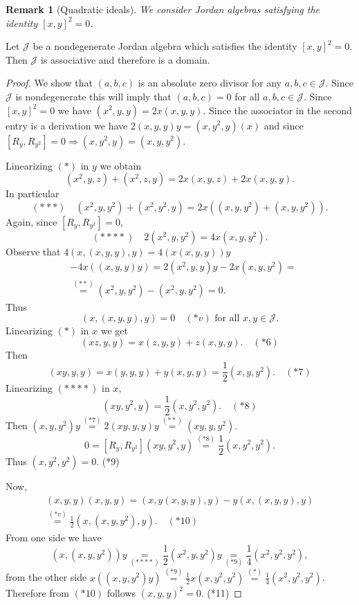 \documentclass{article}
\newtheorem{remark}[theorem]{Remark}
\begin{document}
\begin{remark}[Quadratic ideals]
We consider Jordan algebras satisfying the identity $[x, y]^2 = 0$.
\end{remark}

\begin{theorem}
Let $\mathcal{J}$ be a nondegenerate Jordan algebra which satisfies the identity $[x,y]^2=0$. Then $\mathcal{J}$ is associative and therefore is a domain.
\end{theorem}

\begin{proof}
We show that $(a,b,c)$ is an absolute zero divisor for any $a,b,c \in \mathcal{J}$. Since $\mathcal{J}$ is nondegenerate this will imply that $(a,b,c)=0$ for all $a,b,c \in \mathcal{J}$. Since $[x,y]^2=0$ we have $(x^2,y,y)=2x(x,y,y)$. Since the associator in the second entry is a derivation we have $2(x,y,y)y=(x,y^2,y)(x)$ and since $[R_y,R_{y^2}]=0 \Rightarrow (x,y^2,y)=(x,y,y^2)$.

Linearizing $(*)$ in $y$ we obtain
\[
(x^2,y,z)+(x^2,z,y)=2x(x,y,z)+2x(x,y,y).
\]
In particular
\[
(***)\quad (x^2,y,y^2)+(x^2,y^2,y)=2x\left((x,y,y^2)+(x,y,y^2)\right).
\]
Again, since $[R_y,R_{y^2}]=0$,
\[
(****)\quad 2(x^2,y,y^2)=4x(x,y,y^2).
\]
Observe that $4(x,(x,y,y),y)=4(x(x,y,y))y$
\[
\begin{aligned}
&-4x((x,y,y)y)=2(x^2,y,y)y-2x(x,y,y^2)= \\
&\stackrel{(**)}{=}(x^2,y,y^2)-(x^2,y,y^2)=0.
\end{aligned}
\]
Thus
\[
(x,(x,y,y),y)=0 \quad (*v) \text{ for all } x,y \in \mathcal{J}.
\]
Linearizing $(*)$ in $x$ we get
\[
(xz,y,y)=x(z,y,y)+z(x,y,y). \quad (*6)
\]
Then
\[
(xy,y,y)=x(y,y,y)+y(x,y,y)=\frac{1}{2}(x,y,y^2). \quad (*7)
\]
Linearizing $(****)$ in $x$,
\[
(xy,y^2,y)=\frac{1}{2}(x,y^2,y^2). \quad (*8)
\]
Then $(x,y,y^2)y \stackrel{(*7)}{=} 2(xy,y,y)y \stackrel{(**)}{=} (xy,y,y^2)$.
\[
0=[R_y,R_{y^2}](xy,y^2,y) \stackrel{(*8)}{=} \frac{1}{2}(x,y^2,y^2).
\]
Thus $(x,y^2,y^2)=0$. \quad (*9)

Now,
\[
\begin{gathered}
(x,y,y)(x,y,y)=(x,y(x,y,y),y)-y(x,(x,y,y),y) \\
\stackrel{(*v)}{=} \frac{1}{2}\left(x,\left(x,y,y^2\right),y\right). \quad (*10)
\end{gathered}
\]
From one side we have
\[
\left(x,\left(x,y,y^2\right)\right)y \underset{(****)}{=} \frac{1}{2}(x^2,y,y^2)y \underset{(*9)}{=} \frac{1}{4}(x^2,y^2,y^2),
\]
from the other side $x\left(\left(x,y,y^2\right)y\right) \stackrel{(*9)}{=} \frac{1}{2}x\left(x,y^2,y^2\right) \stackrel{(*)}{=} \frac{1}{4}\left(x^2,y^2,y^2\right)$.
Therefore from $(*10)$ follows $(x,y,y)^2=0$. \quad (*11)


\end{proof}
\end{document}
